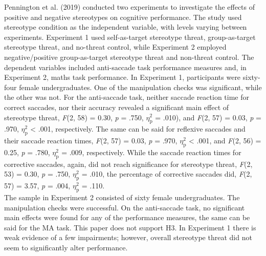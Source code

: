 \documentclass[
  stu, a4paper,floatsintext]{apa7}
\begin{document}
Pennington et al. (2019) conducted two experiments to investigate the effects of positive and negative stereotypes on cognitive performance.
The study used stereotype condition as the independent variable, with levels varying between experiments.
Experiment 1 used self-as-target stereotype threat, group-as-target stereotype threat, and no-threat control, while Experiment 2 employed negative/positive group-as-target stereotype threat and non-threat control.
The dependent variables included anti-saccade task performance measures and, in Experiment 2, maths task performance.
In Experiment 1, participants were sixty-four female undergraduates.
One of the manipulation checks was significant, while the other was not.
For the anti-saccade task, neither saccade reaction time for correct saccades, nor their accuracy revealed a significant main effect of stereotype threat, \emph{F}(2, 58) = 0.30, \emph{p} = .750, \(\eta^{2}_{\text{p}}\) = .010), and \emph{F}(2, 57) = 0.03, \emph{p} = .970, \(\eta^{2}_{\text{p}}\) \textless{} .001, respectively.
The same can be said for reflexive saccades and their saccade reaction times, \emph{F}(2, 57) = 0.03, \emph{p} = .970, \(\eta^{2}_{\text{p}}\) \textless{} .001, and \emph{F}(2, 56) = 0.25, \emph{p} = .780, \(\eta^{2}_{\text{p}}\) = .009, respectively.
While the saccade reaction times for corrective saccades, again, did not reach significance for stereotype threat, \emph{F}(2, 53) = 0.30, \emph{p} = .750, \(\eta^{2}_{\text{p}}\) = .010, the percentage of corrective saccades did, \emph{F}(2, 57) = 3.57, \emph{p} = .004, \(\eta^{2}_{\text{p}}\) = .110.\\
The sample in Experiment 2 consisted of sixty female undergraduates.
The manipulation checks were successful.
On the anti-saccade task, no significant main effects were found for any of the performance measures, the same can be said for the MA task.
This paper does not support H3. In Experiment 1 there is weak evidence of a few impairments; however, overall stereotype threat did not seem to significantly alter performance.
\end{document}
